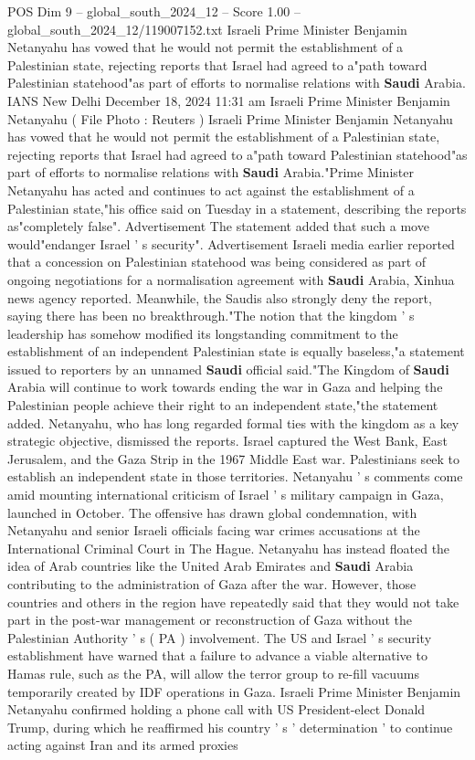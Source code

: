 \begin{textsample}{POS Dim 9 – global\_south\_2024\_12 – Score 1.00 – global\_south\_2024\_12/119007152.txt}  \label{ex:f9_pos_230}
Israeli Prime Minister Benjamin Netanyahu has vowed that he would not permit the establishment of a Palestinian state, rejecting reports that Israel had agreed to a"path toward Palestinian statehood"as part of efforts to normalise relations with \textbf{Saudi} Arabia.
IANS New Delhi December 18, 2024 11:31 am Israeli Prime Minister Benjamin Netanyahu ( File Photo : Reuters ) Israeli Prime Minister Benjamin Netanyahu has vowed that he would not permit the establishment of a Palestinian state, rejecting reports that Israel had agreed to a"path toward Palestinian statehood"as part of efforts to normalise relations with \textbf{Saudi} Arabia."Prime Minister Netanyahu has acted and continues to act against the establishment of a Palestinian state,"his office said on Tuesday in a statement, describing the reports as"completely false".
Advertisement The statement added that such a move would"endanger Israel ' s security".
Advertisement Israeli media earlier reported that a concession on Palestinian statehood was being considered as part of ongoing negotiations for a normalisation agreement with \textbf{Saudi} Arabia, Xinhua news agency reported.
Meanwhile, the Saudis also strongly deny the report, saying there has been no breakthrough."The notion that the kingdom ' s leadership has somehow modified its longstanding commitment to the establishment of an independent Palestinian state is equally baseless,"a statement issued to reporters by an unnamed \textbf{Saudi} official said."The Kingdom of \textbf{Saudi} Arabia will continue to work towards ending the war in Gaza and helping the Palestinian people achieve their right to an independent state,"the statement added.
Netanyahu, who has long regarded formal ties with the kingdom as a key strategic objective, dismissed the reports.
Israel captured the West Bank, East Jerusalem, and the Gaza Strip in the 1967 Middle East war.
Palestinians seek to establish an independent state in those territories.
Netanyahu ' s comments come amid mounting international criticism of Israel ' s military campaign in Gaza, launched in October.
The offensive has drawn global condemnation, with Netanyahu and senior Israeli officials facing war crimes accusations at the International Criminal Court in The Hague.
Netanyahu has instead floated the idea of Arab countries like the United Arab Emirates and \textbf{Saudi} Arabia contributing to the administration of Gaza after the war.
However, those countries and others in the region have repeatedly said that they would not take part in the post-war management or reconstruction of Gaza without the Palestinian Authority ' s ( PA ) involvement.
The US and Israel ' s security establishment have warned that a failure to advance a viable alternative to Hamas rule, such as the PA, will allow the terror group to re-fill vacuums temporarily created by IDF operations in Gaza.
Israeli Prime Minister Benjamin Netanyahu confirmed holding a phone call with US President-elect Donald Trump, during which he reaffirmed his country ' s ' determination ' to continue acting against Iran and its armed proxies

\end{textsample}
